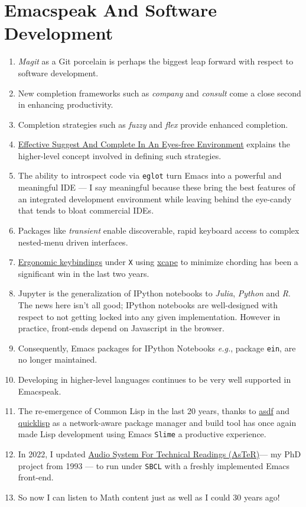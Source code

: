 \documentclass[11pt]{article}
\begin{document}
\section{Emacspeak And Software Development}
\label{sec:org6b19200}

\begin{enumerate}
\item \emph{Magit}  as a Git porcelain is perhaps the biggest leap forward
with respect to software development.
\item New completion frameworks such as \emph{company} and \emph{consult} come a
close second in enhancing productivity.
\item Completion strategies such as  \emph{fuzzy} and
\emph{flex} provide  enhanced completion.
\item \href{https://emacspeak.blogspot.com/2018/06/effective-suggest-and-complete-in-eyes.html}{Effective Suggest And Complete In An Eyes-free Environment}
explains the higher-level concept  involved in defining such strategies.

\item The ability to introspect code via  \texttt{eglot} 
 turn Emacs into a powerful and meaningful IDE ---  I say
meaningful because these bring the best features of an integrated
development environment while leaving behind the eye-candy that
tends to bloat commercial IDEs.
\item Packages like \emph{transient}  enable discoverable, rapid keyboard access to
complex nested-menu driven interfaces.
\item \href{https://emacspeak.blogspot.com/2023/09/emacs-ergonomics-dont-punish-your.html}{Ergonomic keybindings} under \texttt{X} using \href{https://github.com/alols/xcape}{xcape} to minimize
chording has been  a significant win in the last two years.
\item Jupyter is the   generalization of IPython notebooks to \emph{Julia}, \emph{Python}
and \emph{R}. The news here isn't all good; IPython notebooks are
well-designed with respect to not getting locked into any given
implementation. However in practice,  front-ends
depend on Javascript in the  browser.
\item Consequently,  Emacs  packages  for IPython
Notebooks \emph{e.g.}, package \texttt{ein},  are no longer maintained.
\item Developing in higher-level languages continues to be very well
supported in Emacspeak.
\item The re-emergence of Common Lisp in the last 20 years, thanks to
\href{https://asdf.common-lisp.dev/asdf.html}{asdf} and \href{https://www.quicklisp.org/}{quicklisp} as a network-aware package manager and build
tool has once again made Lisp development using Emacs \texttt{Slime} a
productive experience.
\item In 2022, I updated \href{https://emacspeak.blogspot.com/2022/12/aster-spoken-math-on-emacspeak-audio\_21.html}{Audio System For Technical
Readings (AsTeR)}--- my PhD project from 1993 --- to run under \texttt{SBCL}
with a freshly implemented Emacs front-end.
\item So now I can listen to Math content just as well as I could 30
years ago!
\end{enumerate}
\end{document}
